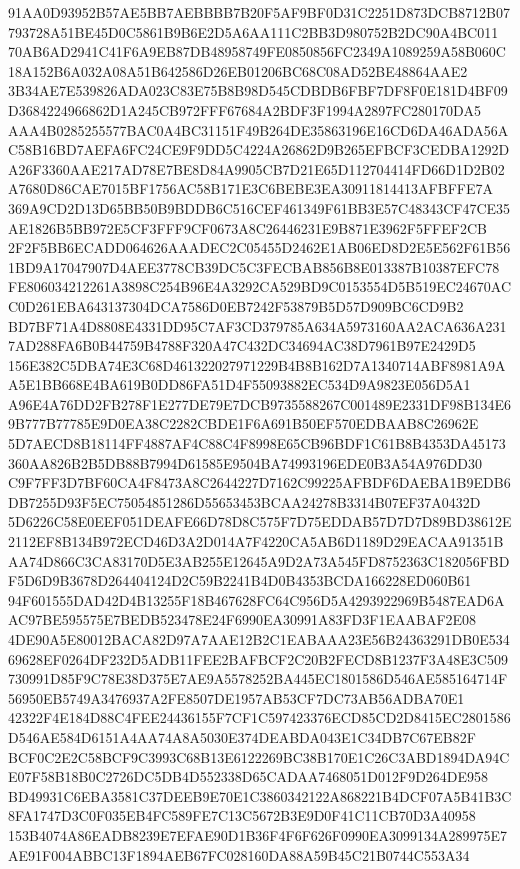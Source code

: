 \documentclass[UTF8,fontset=fandol,zihao=-4,a4paper]{ctexart}
\begin{document}
{{91AA0D93952B57AE5BB7AEBBBB7B20F5AF9BF0D31C2251D873DCB8712B07793728A51BE45D0C5861B9B6E2D5A6AA111C2BB3D980752B2DC90A4BC011
70AB6AD2941C41F6A9EB87DB48958749FE0850856FC2349A1089259A58B060C18A152B6A032A08A51B642586D26EB01206BC68C08AD52BE48864AAE2
3B34AE7E539826ADA023C83E75B8B98D545CDBDB6FBF7DF8F0E181D4BF09D3684224966862D1A245CB972FFF67684A2BDF3F1994A2897FC280170DA5
AAA4B0285255577BAC0A4BC31151F49B264DE35863196E16CD6DA46ADA56AC58B16BD7AEFA6FC24CE9F9DD5C4224A26862D9B265EFBCF3CEDBA1292D
A26F3360AAE217AD78E7BE8D84A9905CB7D21E65D112704414FD66D1D2B02A7680D86CAE7015BF1756AC58B171E3C6BEBE3EA30911814413AFBFFE7A
369A9CD2D13D65BB50B9BDDB6C516CEF461349F61BB3E57C48343CF47CE35AE1826B5BB972E5CF3FFF9CF0673A8C26446231E9B871E3962F5FFEF2CB
2F2F5BB6ECADD064626AAADEC2C05455D2462E1AB06ED8D2E5E562F61B561BD9A17047907D4AEE3778CB39DC5C3FECBAB856B8E013387B10387EFC78
FE806034212261A3898C254B96E4A3292CA529BD9C0153554D5B519EC24670ACC0D261EBA643137304DCA7586D0EB7242F53879B5D57D909BC6CD9B2
BD7BF71A4D8808E4331DD95C7AF3CD379785A634A5973160AA2ACA636A2317AD288FA6B0B44759B4788F320A47C432DC34694AC38D7961B97E2429D5
156E382C5DBA74E3C68D461322027971229B4B8B162D7A1340714ABF8981A9AA5E1BB668E4BA619B0DD86FA51D4F55093882EC534D9A9823E056D5A1
A96E4A76DD2FB278F1E277DE79E7DCB9735588267C001489E2331DF98B134E69B777B77785E9D0EA38C2282CBDE1F6A691B50EF570EDBAAB8C26962E
5D7AECD8B18114FF4887AF4C88C4F8998E65CB96BDF1C61B8B4353DA45173360AA826B2B5DB88B7994D61585E9504BA74993196EDE0B3A54A976DD30
C9F7FF3D7BF60CA4F8473A8C2644227D7162C99225AFBDF6DAEBA1B9EDB6DB7255D93F5EC75054851286D55653453BCAA24278B3314B07EF37A0432D
5D6226C58E0EEF051DEAFE66D78D8C575F7D75EDDAB57D7D7D89BD38612E2112EF8B134B972ECD46D3A2D014A7F4220CA5AB6D1189D29EACAA91351B
AA74D866C3CA83170D5E3AB255E12645A9D2A73A545FD8752363C182056FBDF5D6D9B3678D264404124D2C59B2241B4D0B4353BCDA166228ED060B61
94F601555DAD42D4B13255F18B467628FC64C956D5A4293922969B5487EAD6AAC97BE595575E7BEDB523478E24F6990EA30991A83FD3F1EAABAF2E08
4DE90A5E80012BACA82D97A7AAE12B2C1EABAAA23E56B24363291DB0E53469628EF0264DF232D5ADB11FEE2BAFBCF2C20B2FECD8B1237F3A48E3C509
730991D85F9C78E38D375E7AE9A5578252BA445EC1801586D546AE585164714F56950EB5749A3476937A2FE8507DE1957AB53CF7DC73AB56ADBA70E1
42322F4E184D88C4FEE24436155F7CF1C597423376ECD85CD2D8415EC2801586D546AE584D6151A4AA74A8A5030E374DEABDA043E1C34DB7C67EB82F
BCF0C2E2C58BCF9C3993C68B13E6122269BC38B170E1C26C3ABD1894DA94CE07F58B18B0C2726DC5DB4D552338D65CADAA7468051D012F9D264DE958
BD49931C6EBA3581C37DEEB9E70E1C3860342122A868221B4DCF07A5B41B3C8FA1747D3C0F035EB4FC589FE7C13C5672B3E9D0F41C11CB70D3A40958
153B4074A86EADB8239E7EFAE90D1B36F4F6F626F0990EA3099134A289975E7AE91F004ABBC13F1894AEB67FC028160DA88A59B45C21B0744C553A34
}}
\end{document}

